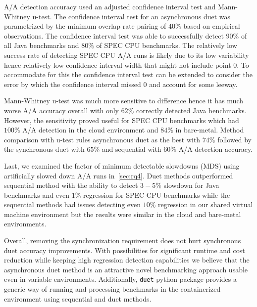 A/A detection accuracy used an adjusted confidence interval test and \mbox{Mann-Whitney} \mbox{u-test}.
The confidence interval test for an asynchronous duet was parametrized by the minimum overlap rate pairing of $40\%$ based on empirical observations.
The confidence interval test was able to successfully detect $90\%$ of all Java benchmarks and $80\%$ of SPEC CPU benchmarks.
The relatively low success rate of detecting SPEC CPU A/A runs is likely due to its low variability hence relatively low confidence interval width that might not include point $0$.
To accommodate for this the confidence interval test can be extended to consider the error by which the confidence interval missed $0$ and account for some leeway.

\mbox{Mann-Whitney} \mbox{u-test} was much more sensitive to difference hence it has much worse A/A accuracy overall with only $62\%$ correctly detected Java benchmarks.
However, the sensitivity proved useful for SPEC CPU benchmarks which had $100\%$ A/A detection in the cloud environment and $84\%$ in \mbox{bare-metal}.
Method comparison with \mbox{u-test} rules asynchronous duet as the best with $74\%$ followed by the synchronous duet with $65\%$ and sequential with $60\%$ A/A detection accuracy.

Last, we examined the factor of minimum detectable slowdowns (MDS) using artificially slowed down A/A runs in~\cref{sec:rq4}.
Duet methods outperformed sequential method with the ability to detect $3-5\%$ slowdown for Java benchmarks and even $1\%$ regression for SPEC CPU benchmarks while the sequential methods had issues detecting even $10\%$ regression in our shared virtual machine environment but the results were similar in the cloud and bare-metal environments.

Overall, removing the synchronization requirement does not hurt synchronous duet accuracy improvements.
With possibilities for significant runtime and cost reduction while keeping high regression detection capabilities we believe that the asynchronous duet method is an attractive novel benchmarking approach usable even in variable environments.
Additionally, \lstinline{duet} python package provides a generic way of running and processing benchmarks in the containerized environment using sequential and duet methods.

